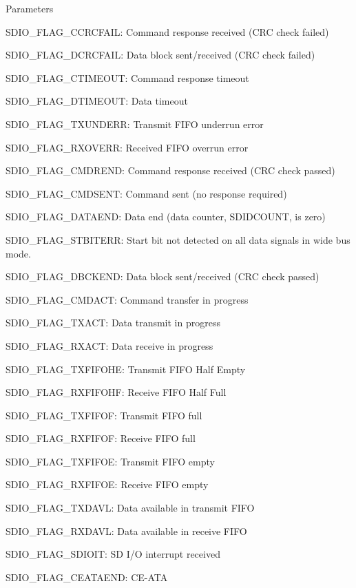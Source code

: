 \begin{DoxyParams}{Parameters}
\begin{DoxyItemize}
\item S\+D\+I\+O\+\_\+\+F\+L\+A\+G\+\_\+\+C\+C\+R\+C\+F\+A\+IL\+: Command response received (C\+RC check failed) \item S\+D\+I\+O\+\_\+\+F\+L\+A\+G\+\_\+\+D\+C\+R\+C\+F\+A\+IL\+: Data block sent/received (C\+RC check failed) \item S\+D\+I\+O\+\_\+\+F\+L\+A\+G\+\_\+\+C\+T\+I\+M\+E\+O\+UT\+: Command response timeout \item S\+D\+I\+O\+\_\+\+F\+L\+A\+G\+\_\+\+D\+T\+I\+M\+E\+O\+UT\+: Data timeout \item S\+D\+I\+O\+\_\+\+F\+L\+A\+G\+\_\+\+T\+X\+U\+N\+D\+E\+RR\+: Transmit F\+I\+FO underrun error \item S\+D\+I\+O\+\_\+\+F\+L\+A\+G\+\_\+\+R\+X\+O\+V\+E\+RR\+: Received F\+I\+FO overrun error \item S\+D\+I\+O\+\_\+\+F\+L\+A\+G\+\_\+\+C\+M\+D\+R\+E\+ND\+: Command response received (C\+RC check passed) \item S\+D\+I\+O\+\_\+\+F\+L\+A\+G\+\_\+\+C\+M\+D\+S\+E\+NT\+: Command sent (no response required) \item S\+D\+I\+O\+\_\+\+F\+L\+A\+G\+\_\+\+D\+A\+T\+A\+E\+ND\+: Data end (data counter, S\+D\+I\+D\+C\+O\+U\+NT, is zero) \item S\+D\+I\+O\+\_\+\+F\+L\+A\+G\+\_\+\+S\+T\+B\+I\+T\+E\+RR\+: Start bit not detected on all data signals in wide bus mode. \item S\+D\+I\+O\+\_\+\+F\+L\+A\+G\+\_\+\+D\+B\+C\+K\+E\+ND\+: Data block sent/received (C\+RC check passed) \item S\+D\+I\+O\+\_\+\+F\+L\+A\+G\+\_\+\+C\+M\+D\+A\+CT\+: Command transfer in progress \item S\+D\+I\+O\+\_\+\+F\+L\+A\+G\+\_\+\+T\+X\+A\+CT\+: Data transmit in progress \item S\+D\+I\+O\+\_\+\+F\+L\+A\+G\+\_\+\+R\+X\+A\+CT\+: Data receive in progress \item S\+D\+I\+O\+\_\+\+F\+L\+A\+G\+\_\+\+T\+X\+F\+I\+F\+O\+HE\+: Transmit F\+I\+FO Half Empty \item S\+D\+I\+O\+\_\+\+F\+L\+A\+G\+\_\+\+R\+X\+F\+I\+F\+O\+HF\+: Receive F\+I\+FO Half Full \item S\+D\+I\+O\+\_\+\+F\+L\+A\+G\+\_\+\+T\+X\+F\+I\+F\+OF\+: Transmit F\+I\+FO full \item S\+D\+I\+O\+\_\+\+F\+L\+A\+G\+\_\+\+R\+X\+F\+I\+F\+OF\+: Receive F\+I\+FO full \item S\+D\+I\+O\+\_\+\+F\+L\+A\+G\+\_\+\+T\+X\+F\+I\+F\+OE\+: Transmit F\+I\+FO empty \item S\+D\+I\+O\+\_\+\+F\+L\+A\+G\+\_\+\+R\+X\+F\+I\+F\+OE\+: Receive F\+I\+FO empty \item S\+D\+I\+O\+\_\+\+F\+L\+A\+G\+\_\+\+T\+X\+D\+A\+VL\+: Data available in transmit F\+I\+FO \item S\+D\+I\+O\+\_\+\+F\+L\+A\+G\+\_\+\+R\+X\+D\+A\+VL\+: Data available in receive F\+I\+FO \item S\+D\+I\+O\+\_\+\+F\+L\+A\+G\+\_\+\+S\+D\+I\+O\+IT\+: SD I/O interrupt received \item S\+D\+I\+O\+\_\+\+F\+L\+A\+G\+\_\+\+C\+E\+A\+T\+A\+E\+ND\+: C\+E-\/\+A\+TA 
\end{DoxyItemize}
\end{DoxyParams}
